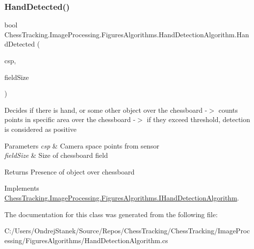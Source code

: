 \subsubsection{\texorpdfstring{HandDetected()}{HandDetected()}}
{\footnotesize\ttfamily bool Chess\+Tracking.\+Image\+Processing.\+Figures\+Algorithms.\+Hand\+Detection\+Algorithm.\+Hand\+Detected (\begin{DoxyParamCaption}\item[{Camera\+Space\+Point \mbox{[}$\,$\mbox{]}}]{csp,  }\item[{double}]{field\+Size }\end{DoxyParamCaption})}



Decides if there is hand, or some other object over the chessboard -\/$>$ counts points in specific area over the chessboard -\/$>$ if they exceed threshold, detection is considered as positive 


\begin{DoxyParams}{Parameters}
{\em csp} & Camera space points from sensor\\
\hline
{\em field\+Size} & Size of chessboard field\\
\hline
\end{DoxyParams}
\begin{DoxyReturn}{Returns}
Presence of object over chessboard
\end{DoxyReturn}


Implements \mbox{\hyperlink{interface_chess_tracking_1_1_image_processing_1_1_figures_algorithms_1_1_i_hand_detection_algorithm}{Chess\+Tracking.\+Image\+Processing.\+Figures\+Algorithms.\+I\+Hand\+Detection\+Algorithm}}.



The documentation for this class was generated from the following file\+:\begin{DoxyCompactItemize}
\item 
C\+:/\+Users/\+Ondrej\+Stanek/\+Source/\+Repos/\+Chess\+Tracking/\+Chess\+Tracking/\+Image\+Processing/\+Figures\+Algorithms/Hand\+Detection\+Algorithm.\+cs\end{DoxyCompactItemize}

